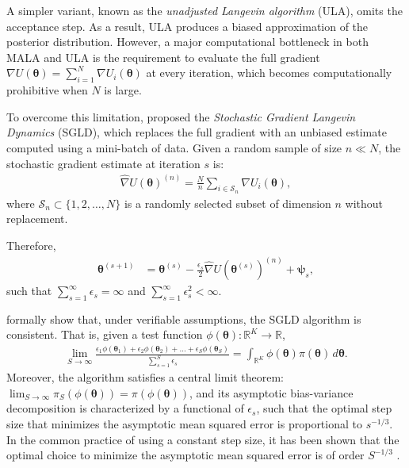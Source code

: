 A simpler variant, known as the \textit{unadjusted Langevin algorithm} (ULA), omits the acceptance step. As a result, ULA produces a biased approximation of the posterior distribution. However, a major computational bottleneck in both MALA and ULA is the requirement to evaluate the full gradient \( \nabla U(\boldsymbol{\theta}) = \sum_{i=1}^N \nabla U_i(\boldsymbol{\theta}) \) at every iteration, which becomes computationally prohibitive when \( N \) is large.

To overcome this limitation, \cite{welling2011bayesian} proposed the \textit{Stochastic Gradient Langevin Dynamics} (SGLD), which replaces the full gradient with an unbiased estimate computed using a mini-batch of data. Given a random sample of size \( n \ll N \), the stochastic gradient estimate at iteration \( s \) is:
\begin{align} \label{eq:grad}
	\hat{\nabla} U(\boldsymbol{\theta})^{(n)} = \frac{N}{n} \sum_{i \in \mathcal{S}_n} \nabla U_i(\boldsymbol{\theta}),
\end{align}
where \( \mathcal{S}_n \subset \{1, 2, \dots, N\} \) is a randomly selected subset of dimension $n$ without replacement.

Therefore, 
\begin{align*}
	\boldsymbol{\theta}^{(s+1)}&= \boldsymbol{\theta}^{(s)} -\frac{\epsilon_s}{2}\hat{\nabla} U(\boldsymbol{\theta}^{(s)})^{(n)}+\boldsymbol{\psi}_s,
\end{align*}
such that $\sum_{s=1}^{\infty}\epsilon_s=\infty$ and $\sum_{s=1}^{\infty}\epsilon_s^2<\infty$.

\cite{teh2016consistency} formally show that, under verifiable assumptions, the SGLD algorithm is consistent. That is, given a test function $\phi(\boldsymbol{\theta}): \mathbb{R}^K \rightarrow \mathbb{R}$,
\begin{align*}
	\lim_{S \rightarrow \infty} \frac{\epsilon_1 \phi(\boldsymbol{\theta}_1) + \epsilon_2 \phi(\boldsymbol{\theta}_2) + \dots + \epsilon_S \phi(\boldsymbol{\theta}_S)}{\sum_{s=1}^S \epsilon_s} = \int_{\mathbb{R}^K} \phi(\boldsymbol{\theta}) \pi(\boldsymbol{\theta}) \, d\boldsymbol{\theta}.
\end{align*}
Moreover, the algorithm satisfies a central limit theorem: $\lim_{S \rightarrow \infty} \pi_S(\phi(\boldsymbol{\theta})) = \pi(\phi(\boldsymbol{\theta}))$, and its asymptotic bias-variance decomposition is characterized by a functional of $\epsilon_s$, such that the optimal step size that minimizes the asymptotic mean squared error is proportional to $s^{-1/3}$. In the common practice of using a constant step size, it has been shown that the optimal choice to minimize the asymptotic mean squared error is of order \( S^{-1/3} \) \cite{vollmer2016exploration}. 


